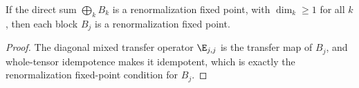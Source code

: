\begin{lemma}%
    \label{lem:isrfp_block_of_rfp_direct_sum}
    \leanok
    If the direct sum $\bigoplus_k B_k$ is a renormalization fixed point, with
    $\dim_k \ge 1$ for all $k$, then each block $B_j$ is a renormalization fixed
    point.
\end{lemma}
\begin{proof}\leanok
    The diagonal mixed transfer operator $\E_{j,j}$ is the transfer map of
    $B_j$, and whole-tensor idempotence makes it idempotent, which is exactly the
    renormalization fixed-point condition for $B_j$.
\end{proof}


